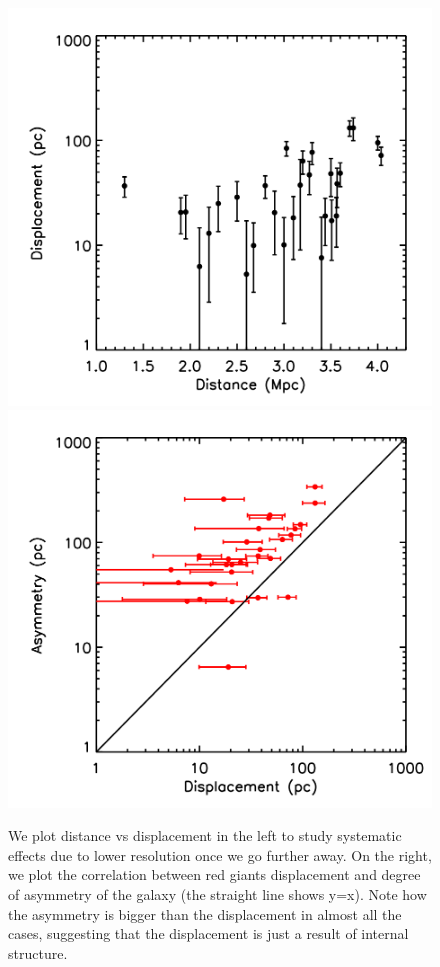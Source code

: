 \documentclass[useAMS,usenatbib,twocolumn]{mn2e}
\begin{document}
\begin{figure}
\includegraphics[scale=0.2]{figures/dispdist.png}
\includegraphics[scale=0.2]{figures/dispdispcm.png}
  \caption{We plot distance vs displacement in the left to study systematic
effects due to lower resolution once we go further away.
On the right, we plot the
correlation between red giants displacement and degree of asymmetry of the
galaxy (the straight line shows y=x). Note how the asymmetry is bigger than
the displacement in almost all the cases, 
suggesting that the displacement is just a result of internal structure.}
\label{fig:rgsyst}
\end{figure}
\end{document}
